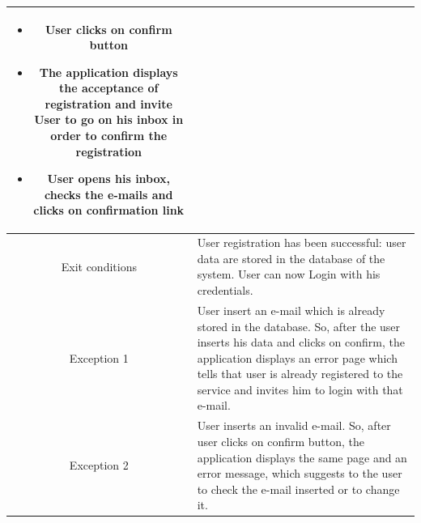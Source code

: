\documentclass[table, 12pt]{article}
\begin{document}
\begin{longtable}{ | c | p{10cm} | }
\begin{itemize}[nosep,after=\strut]
        \item User clicks on confirm button
        \item The application displays the acceptance of registration and invite User to go on his inbox in order to confirm the registration
        \item User opens his inbox, checks the e-mails and clicks on confirmation link
    \end{itemize}                                                                                                                                                                                                                                             \\
    \hline
    Exit conditions  & User registration has been successful: user data are stored in the database of the system. User can now Login with his credentials.                                                                                                                                    \\
    \hline
    \hline
    Exception 1      & User insert an e-mail which is already stored in the database. So, after the user inserts his data and clicks on confirm, the application displays an error page which tells that user is already registered to the service and invites him to login with that e-mail. \\
    \hline
    Exception 2      & User inserts an invalid e-mail. So, after user clicks on confirm button, the application displays the same page and an error message, which suggests to the user to check the e-mail inserted or to change it.                                                         \\
    \hline
\end{longtable}
\end{document}
